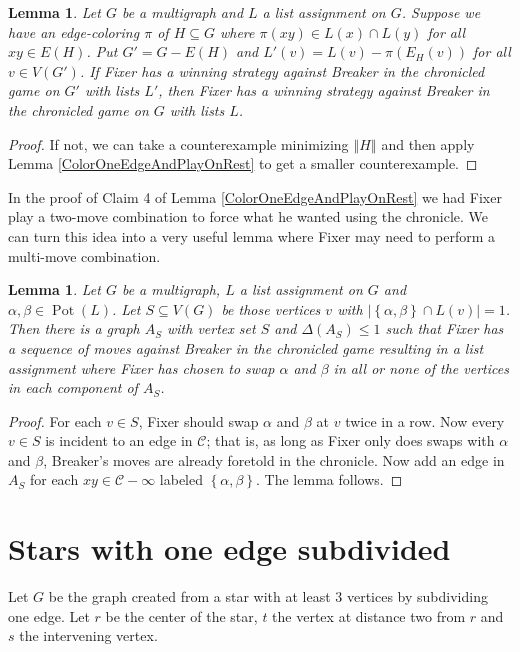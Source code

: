 \documentclass[12pt,reqno]{amsart}
\theoremstyle{plain}
\newtheorem{lem}[thm]{Lemma}
\theoremstyle{definition}
\theoremstyle{remark}
\newcommand{\fancy}[1]{\mathcal{#1}}
\newcommand{\C}[1]{\fancy{C}_{#1}}
\newcommand{\set}[1]{\left\{ #1 \right\}}
\newcommand{\card}[1]{\left|#1\right|}
\newcommand{\size}[1]{\left\Vert#1\right\Vert}
\newcommand{\pot}{\operatorname{Pot}}
\renewcommand{\C}{\fancy{C}}
\begin{document}
\begin{lem}\label{CanColorAndPlayOnRest}
Let $G$ be a multigraph and $L$ a list assignment on $G$.  Suppose we have an edge-coloring $\pi$ of $H \subseteq G$ where $\pi(xy) \in L(x) \cap L(y)$ for all $xy \in E(H)$.  Put $G' = G - E(H)$ and 
$L'(v) = L(v) - \pi(E_H(v))$ for all $v \in V(G')$.  If Fixer has a winning strategy against Breaker in the chronicled game on $G'$ with lists $L'$, then Fixer has a winning strategy against Breaker in the chronicled game on $G$ with lists $L$.
\end{lem}
\begin{proof}
If not, we can take a counterexample minimizing $\size{H}$ and then apply Lemma \ref{ColorOneEdgeAndPlayOnRest} to get a smaller counterexample.
\end{proof}

In the proof of Claim 4 of Lemma \ref{ColorOneEdgeAndPlayOnRest} we had Fixer play a two-move combination to force what he wanted using the chronicle.  We can turn this idea into a very useful lemma where Fixer may need to perform a multi-move combination.

\begin{lem}\label{MultiMoveCombination}
Let $G$ be a multigraph, $L$ a list assignment on $G$ and $\alpha, \beta \in \pot(L)$. Let $S \subseteq V(G)$ be those vertices $v$ with $\card{\set{\alpha, \beta} \cap L(v)} = 1$.  Then there is a graph $A_S$ with vertex set $S$ and $\Delta(A_S) \le 1$ such that Fixer has a sequence of moves against Breaker in the chronicled game resulting in a list assignment where Fixer has chosen to swap $\alpha$ and $\beta$ in all or none of the vertices in each component of $A_S$.
\end{lem}
\begin{proof}
For each $v \in S$, Fixer should swap $\alpha$ and $\beta$ at $v$ twice in a row.  Now every $v \in S$ is incident to an edge in $\C$; that is, as long as Fixer only does swaps with $\alpha$ and $\beta$, Breaker's moves are already foretold in the chronicle.  Now add an edge in $A_S$ for each $xy \in \C - \infty$ labeled $\set{\alpha, \beta}$. The lemma follows.
\end{proof}

\section{Stars with one edge subdivided}
Let $G$ be the graph created from a star with at least $3$ vertices by subdividing one edge.  Let $r$ be the center of the star, $t$ the vertex at distance two from $r$ and $s$ the intervening vertex.
\end{document}
